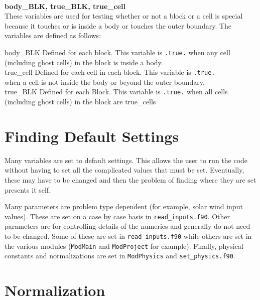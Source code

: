 \ \ \\
{\bf body\_BLK, true\_BLK, true\_cell} \\
These variables are used for testing whether or not a block or a cell
is special because it touches or is inside a body or touches the
outer boundary.  The variables are defined as follows:
\begin{tabbing}
body\_BLK \hspace{.25in} \= Defined for each block.  This variable is {\tt .true.} when any cell \\ 
                         \> \hspace{.25in}\= (including ghost cells) in the block is inside a body. \\
true\_cell               \> Defined for each cell in each block.  This variable is {\tt .true.} \\
                         \>     \> when a cell is not inside the body or beyond the outer
                                   boundary. \\    
true\_BLK                \> Defined for each Block.  This variable is {\tt .true.} when all cells \\
                         \>     \> (including ghost cells) in the block are true\_cells
\end{tabbing}

\section{Finding Default Settings \label{section:find_defaults}}

Many variables are set to default settings.  This allows the user
to run the code without having to set all the complicated values 
that must be set.  Eventually, these may have to be changed and 
then the problem of finding where they are set presents it self.

Many parameters are problem type dependent (for example, solar wind input
values).  These are set on a case by case basis in {\tt read\_inputs.f90}.
Other parameters are for controlling details of the numerics and generally
do not need to be changed.  Some of these are set in {\tt read\_inputs.f90}
while others are set in the various modules ({\tt ModMain} and {\tt ModProject} for
example).  Finally, physical constants and normalizations are set in
{\tt ModPhysics} and {\tt set\_physics.f90}.

\section{Normalization \label{section:normalization_source}}

